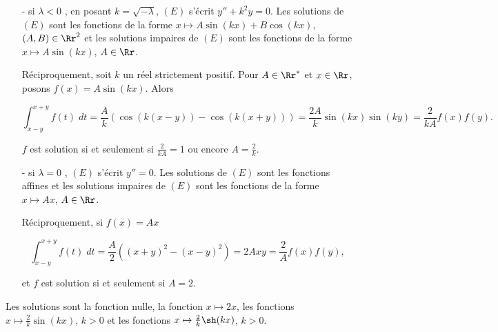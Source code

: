 {{\begin{itemize}
Réciproquement, soit $k$ un réel strictement positif. Pour $A\in\Rr^*$ (on sait que la fonction nulle est solution) et $x\in\Rr$, posons $f(x)=A\sh(kx)$. Alors

$$\int_{x-y}^{x+y}f(t)\;dt=\frac{A}{k}(\ch(k(x+y))-\ch(k(x-y)))\frac{2A}{k}\sh(kx)\sh(ky)=\frac{2}{kA}f(x)f(y).$$

$f$ est solution si et seulement si $\frac{2}{kA}=1$ ou encore $A=\frac{2}{k}$.

\item[- si $\lambda<0$], en posant $k=\sqrt{-\lambda}$, $(E)$ s'écrit $y''+k^2y=0$. Les solutions de $(E)$ sont les fonctions de la forme $x\mapsto A\sin(kx)+B\cos(kx)$, $(A,B)\in\Rr^2$ et les solutions impaires de $(E)$ sont les fonctions de la forme $x\mapsto A\sin(kx)$, $A\in\Rr$.

Réciproquement, soit $k$ un réel strictement positif. Pour $A\in\Rr^*$ et $x\in\Rr$, posons $f(x)=A\sin(kx)$. Alors

$$\int_{x-y}^{x+y}f(t)\;dt=\frac{A}{k}(\cos(k(x-y))-\cos(k(x+y)))=\frac{2A}{k}\sin(kx)\sin(ky)=\frac{2}{kA}f(x)f(y).$$

$f$ est solution si et seulement si $\frac{2}{kA}=1$ ou encore $A=\frac{2}{k}$.

\item[- si $\lambda=0$], $(E)$ s'écrit $y''=0$. Les solutions de $(E)$ sont les fonctions affines et les solutions impaires de $(E)$ sont les fonctions de la forme $x\mapsto Ax$, $A\in\Rr$.

Réciproquement, si $f(x)=Ax$

$$\int_{x-y}^{x+y}f(t)\;dt=\frac{A}{2}((x+y)^2-(x-y)^2)=2Axy=\frac{2}{A}f(x)f(y),$$

et $f$ est solution si et seulement si $A=2$.

\end{itemize}

Les solutions sont la fonction nulle, la fonction $x\mapsto2x$, les fonctions $x\mapsto\frac{2}{k}\sin(kx)$, $k>0$ et les fonctions $x\mapsto\frac{2}{k}\sh(kx)$, $k>0$.
}
}
